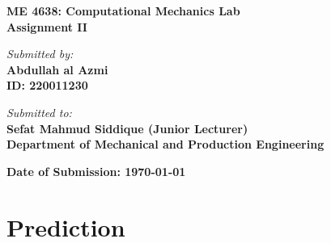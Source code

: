 \documentclass{article}
\begin{document}
\begin{titlepage}
    \begin{center}
        \vspace*{2cm}
        {\Huge \textbf{ ME 4638: Computational Mechanics Lab}} \\
        \vspace{1cm}
        {\Large \textbf{Assignment II}} \\

        \vfill

        \textit{\large Submitted by:} \\
        \vspace{0.3cm}
        \textbf{Abdullah al Azmi} \\
        \textbf{ID: 220011230} \\

        \vfill

        \textit{\large Submitted to:} \\
        \vspace{0.3cm}
        \textbf{\Large Sefat Mahmud Siddique (Junior Lecturer)} \\
        \textbf{Department of Mechanical and Production Engineering} \\

        \vfill

        \textbf{Date of Submission: \today}
        \vspace*{1cm}
    \end{center}
\end{titlepage}

\newpage

\setcounter{section}{3}

\section{Prediction}
\end{document}
